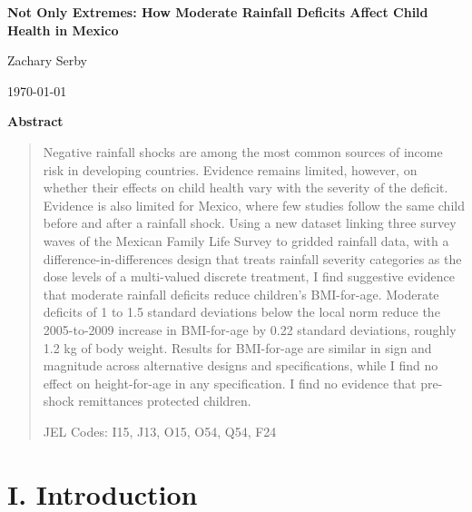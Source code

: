 \documentclass[12pt]{article}
\begin{document}
\begin{titlepage}
\begin{center}
\vspace*{1.2in}
{\LARGE\bfseries Not Only Extremes: How Moderate Rainfall Deficits Affect Child Health in Mexico\par}
\vspace{0.3in}
{\large Zachary Serby\par}
\vspace{0.15in}
{\large \today\par}
\vspace{0.3in}
{\bfseries Abstract\par}
\end{center}
\begin{quote}
Negative rainfall shocks are among the most common sources of income risk in developing countries. Evidence remains limited, however, on whether their effects on child health vary with the severity of the deficit. Evidence is also limited for Mexico, where few studies follow the same child before and after a rainfall shock. Using a new dataset linking three survey waves of the Mexican Family Life Survey to gridded rainfall data, with a difference-in-differences design that treats rainfall severity categories as the dose levels of a multi-valued discrete treatment, I find suggestive evidence that moderate rainfall deficits reduce children's BMI-for-age. Moderate deficits of 1 to 1.5 standard deviations below the local norm reduce the 2005-to-2009 increase in BMI-for-age by 0.22 standard deviations, roughly 1.2 kg of body weight. Results for BMI-for-age are similar in sign and magnitude across alternative designs and specifications, while I find no effect on height-for-age in any specification. I find no evidence that pre-shock remittances protected children.

\vspace{0.15in}
JEL Codes: I15, J13, O15, O54, Q54, F24
\end{quote}
\end{titlepage}

\section*{I. Introduction}\label{sec:I}
\end{document}
